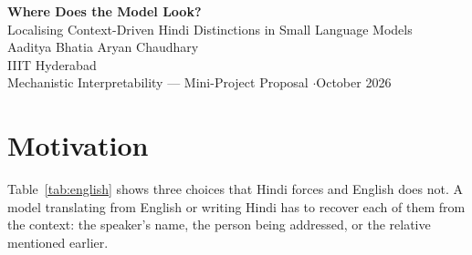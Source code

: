 \documentclass[11pt,a4paper]{article}
\newcommand{\hi}[1]{{\devfont #1}}
\begin{document}
\begin{center}
{\LARGE\bfseries Where Does the Model Look?}\\[0.4em]
{\large Localising Context-Driven Hindi Distinctions in Small Language Models}\\[1em]
{\normalsize Aaditya Bhatia \qquad Aryan Chaudhary}\\[0.2em]
{\small IIIT Hyderabad}\\[0.2em]
{\small Mechanistic Interpretability --- Mini-Project Proposal \quad$\cdot$\quad October 2026}
\end{center}

\vspace{0.4em}
\begin{abstract}
\noindent Hindi makes a model choose between forms that English collapses into one word: the speaker's gender in first-person verbs (\hi{गया}/\hi{गई}), the formality of ``you'' (\hi{आप}/\hi{तुम}/\hi{तू}), and the side of the family in kinship terms (\hi{मामा}/\hi{चाचा}). The information for each choice is not in the word itself; it has to come from the context. Benchmarks show that LLMs often get these choices wrong, but none explains why. We propose to find, in Gemma-3-4B, whether correct outputs are caused by the context cue or by a default prior, which positions, layers, heads and MLPs carry the cue to the answer, and whether failures happen because the cue is never encoded or because it is encoded but not used. We use causal methods only to support claims: activation patching, linear probes with control tasks, the logit lens with direct logit attribution, pre-trained sparse autoencoders, and steering. Sarvam-1, a 2B model built for Indian languages, is the fallback for any task Gemma-3-4B cannot do. No model training is needed beyond linear probes.
\end{abstract}

\section{Motivation}

Table~\ref{tab:english} shows three choices that Hindi forces and English does not. A model translating from English or writing Hindi has to recover each of them from the context: the speaker's name, the person being addressed, or the relative mentioned earlier.
\end{document}
